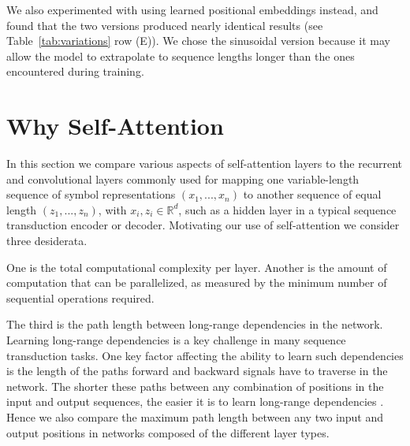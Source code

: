 \documentclass{article}
\begin{document}
We also experimented with using learned positional embeddings \citep{JonasFaceNet2017} instead, and found that the two versions produced nearly identical results (see Table~\ref{tab:variations} row (E)).  We chose the sinusoidal version because it may allow the model to extrapolate to sequence lengths longer than the ones encountered during training.

\section{Why Self-Attention}

In this section we compare various aspects of self-attention layers to the recurrent and convolutional layers commonly used for mapping one variable-length sequence of symbol representations $(x_1, ..., x_n)$ to another sequence of equal length $(z_1, ..., z_n)$, with $x_i, z_i \in \mathbb{R}^d$, such as a hidden layer in a typical sequence transduction encoder or decoder. Motivating our use of self-attention we consider three desiderata.

One is the total computational complexity per layer.
Another is the amount of computation that can be parallelized, as measured by the minimum number of sequential operations required.

The third is the path length between long-range dependencies in the network. Learning long-range dependencies is a key challenge in many sequence transduction tasks. One key factor affecting the ability to learn such dependencies is the length of the paths forward and backward signals have to traverse in the network. The shorter these paths between any combination of positions in the input and output sequences, the easier it is to learn long-range dependencies \citep{hochreiter2001gradient}. Hence we also compare the maximum path length between any two input and output positions in networks composed of the different layer types.
\end{document}
